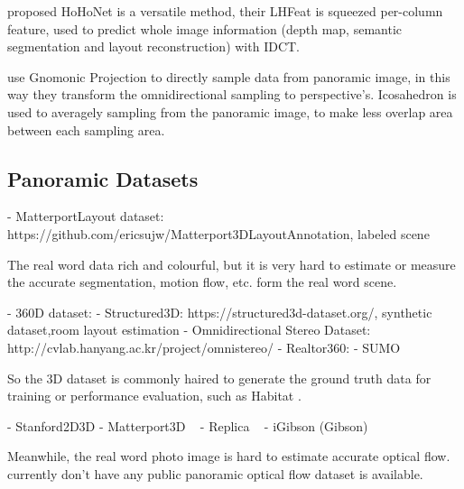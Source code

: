 \citet{SunSC2021} proposed HoHoNet is a versatile method, their LHFeat is squeezed per-column feature, used to predict whole image information (depth map, semantic segmentation and layout reconstruction) with IDCT. 
\cite{WangYSCT2020}

\cite{CoorsCG2018} use Gnomonic Projection to directly sample data from panoramic image, in this way they transform the omnidirectional sampling to perspective's.
\cite{EderPVBF2019}\citet{EderSLF2020} Icosahedron is used to averagely sampling from the panoramic image, to make less overlap area between each sampling area.
\citet{luo2019hexagonal}
\citet{zhang2019orientation}
\citet{lee2019spherephd}

\citet{gkitsas2020deep}
\citet{su2019kernel}
\citet{cohen2018spherical}
\citet{jiang2018spherical}

\subsection{Panoramic Datasets}

- MatterportLayout dataset: https://github.com/ericsujw/Matterport3DLayoutAnnotation, labeled scene

The real word data rich and colourful, but it is very hard to estimate or measure the accurate segmentation, motion flow, etc. form the real word scene.

- 360D dataset:
- Structured3D: https://structured3d-dataset.org/, synthetic dataset,room layout estimation
- Omnidirectional Stereo Dataset: http://cvlab.hanyang.ac.kr/project/omnistereo/
- Realtor360: 
- SUMO

So the 3D dataset is commonly haired to generate the ground truth data for training or performance evaluation, such as Habitat \cite{SavvaKMZWJSLKMPB2019}.

- Stanford2D3D \cite{ArmenSZS2017}
- Matterport3D ~\cite{ChangDFHNSSZZ2017}
- Replica ~\cite{StrauWMCWGEMRVCYBYPYZLCBGMPSBSNGLN2019}
- iGibson (Gibson)


Meanwhile, the real word photo image is hard to estimate accurate optical flow.
 currently don't have any public panoramic optical flow dataset is available.
